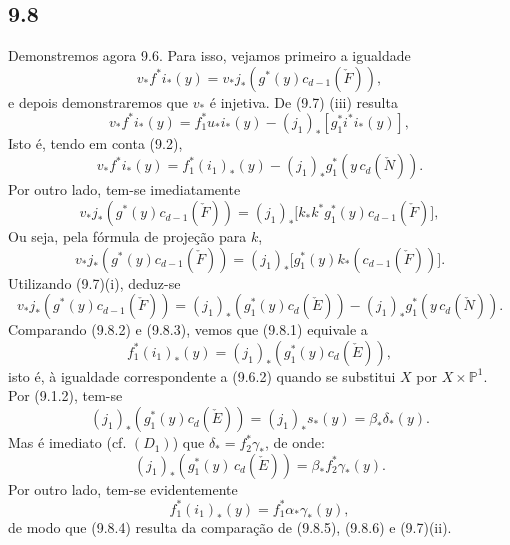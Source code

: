 \subsection*{9.8}

Demonstremos agora 9.6. Para isso, vejamos primeiro a igualdade
\[
v_*f^*i_*(y)=v_*j_*(g^*(y)c_{d-1}(\check F)),
\tag{9.8.1}
\]
e depois demonstraremos que $v_*$ é injetiva. De (9.7) (iii) resulta
\[
v_*f^*i_*(y)=f_1^*u_*i_*(y)-(j_1)_*[g_1^*i^*i_*(y)],
\]
Isto é, tendo em conta (9.2),
\[
v_*f^*i_*(y)=f_1^*(i_1)_*(y)-(j_1)_*g_1^*(y\,c_d(\check N)).
\tag{9.8.2}
\]
Por outro lado, tem-se imediatamente
\[
v_*j_*(g^*(y)c_{d-1}(\check F))
=(j_1)_*\bigl[k_*k^*g_1^*(y)c_{d-1}(\check F)\bigr],
\]
Ou seja, pela fórmula de projeção para $k$,
\[
v_*j_*(g^*(y)c_{d-1}(\check F))
=(j_1)_*\bigl[g_1^*(y)k_*(c_{d-1}(\check F))\bigr].
\]
Utilizando (9.7)(i), deduz-se
\[
v_*j_*(g^*(y)c_{d-1}(\check F))
=(j_1)_*(g_1^*(y)c_d(\check E))-(j_1)_*g_1^*(y\,c_d(\check N)).
\tag{9.8.3}
\]
Comparando (9.8.2) e (9.8.3), vemos que (9.8.1) equivale a
\[
f_1^*(i_1)_*(y)=(j_1)_*(g_1^*(y)c_d(\check E)),
\tag{9.8.4}
\]
isto é, à igualdade correspondente a (9.6.2) quando se substitui $X$ por $X\times\mathbb P^1$. Por (9.1.2), tem-se
\[
(j_1)_*(g_1^*(y)c_d(\check E))=(j_1)_*s_*(y)=\beta_*\delta_*(y).
\]
Mas é imediato (cf. $(D_1)$) que $\delta_*=f_2^*\gamma_*$, de onde:
\[
(j_1)_*(g_1^*(y)\,c_d(\check E))=\beta_*f_2^*\gamma_*(y).
\tag{9.8.5}
\]
Por outro lado, tem-se evidentemente
\[
f_1^*(i_1)_*(y)=f_1^*\alpha_*\gamma_*(y),
\tag{9.8.6}
\]
de modo que (9.8.4) resulta da comparação de (9.8.5), (9.8.6) e (9.7)(ii).
